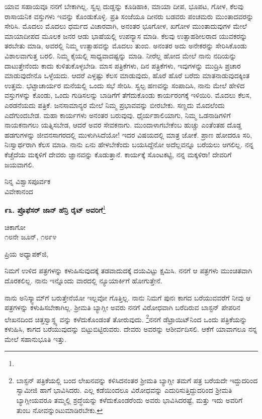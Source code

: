 ಯಾವ ಸಹಾಯವೂ ನನಗೆ ಬೇಕಾಗಿಲ್ಲ. ಸ್ವಲ್ಪ ದುಡ್ಡನ್ನು ಕೂಡಿಹಾಕಿ, ಮಾಯಾ ದೀಪ, ಭೂಪಟ, ಗೋಳ, ಕೆಲವು ರಾಸಾಯನಿಕ ವಸ್ತುಗಳು ಇವನ್ನು ಕೊಂಡುಕೊಳ್ಳಿ. ಪ್ರತಿ ಸಂಜೆಯೂ ದೀನರು ಬಡವರು ಪಂಚಮರು ಮುಂತಾದವರನ್ನು ಸೇರಿಸಿ. ಮೊದಲು ಮೊದಲು ಧರ್ಮದ ವಿಚಾರವಾಗಿ, ಅನಂತರ ಭೂಗೋಳ, ಖಗೋಳ ಮುಂತಾದುವುಗಳ ಮೇಲೆ ಮಾಯಾದೀಪದ ಮೂಲಕ ಜನರ ಆಡು ಭಾಷೆಯಲ್ಲಿ ಉಪನ್ಯಾಸ ಮಾಡಿ. ಕೆಲವು ಉತ್ಸಾಹಶೀಲರಾದ ಯುವಕರನ್ನು ತರಬೇತು ಮಾಡಿ, ಅವರಲ್ಲಿ ನಿಮ್ಮ ಉತ್ಸಾಹವನ್ನು ಮೊದಲು ತುಂಬಿ. ಅನಂತರ ಅದು ಅನೇಕರನ್ನು ಸೇರಿಸಿಕೊಂಡು ವಿಶಾಲವಾಗುತ್ತ ಬರಲಿ. ನಿಮ್ಮ ಕೈಯಲ್ಲಿ ಸಾಧ್ಯವಾದಷ್ಟನ್ನು ಮಾಡಿ. ನೀರೆಲ್ಲ ಹೋದ ಮೇಲೆ ನಾನು ನದಿಯನ್ನು ದಾಟುತ್ತೇನೆಂದು ಕಾದು ಕುಳಿತುಕೊಳ್ಳಬೇಡಿ. ಮಾಸ ಪತ್ರಿಕೆಗಳು, ದಿನ ಪತ್ರಿಕೆಗಳು, ಇವುಗಳನ್ನು ಮುದ್ರಿಸಿ ಪ್ರಚಾರ ಮಾಡುವುದೇನೊ ಒಳ್ಳೆಯದು. ಆದರೆ ಎಳ್ಳಷ್ಟು ಕೆಲಸ ಮಾಡುವುದು, ಹೊರೆ ಹೊರೆ ಬರೆದು ಮಾತನಾಡುವುದಕ್ಕಿಂತ ಉತ್ತಮ. ಭಟ್ಟಾಚಾರ್ಯರ ಮನೆಯಲ್ಲಿ ಒಂದು ಸಭೆ ಸೇರಿಸಿ. ಸ್ವಲ್ಪ ಹಣವನ್ನು ಸಂಪಾದಿಸಿ, ನಾನು ಮೇಲೆ ಹೇಳಿದ ವಸ್ತುಗಳನ್ನು ಕೊಂಡು, ಒಂದು ಗುಡಿಸಲನ್ನು ಬಾಡಿಗೆಗೆ ತೆಗೆದುಕೊಂಡು ಕಾರ್ಯರಂಗಕ್ಕೆ ಇಳಿಯಿರಿ. ಮೊದಲು ಕೆಲಸ, ಎರಡನೆಯದು ಪತ್ರಿಕೆ. ಜನಸಾಮಾನ್ಯರ ಮೇಲೆ ನಿಮ್ಮ ಪ್ರಭಾವವನ್ನು ಬೀರಬೇಕು. ಸಣ್ಣದು ಮೊದಲೆಂದು ಎದೆಗುಂದಬೇಡ. ಮಹಾ ಕಾರ್ಯಗಳು ಅನಂತರ ಬರುವುವು. ಧೈರ್ಯಶಾಲಿಯಾಗು, ನಿಮ್ಮ ಒಡನಾಡಿಗಳಿಗೆ ನಾಯಕನಾಗಲು ಯತ್ನಿಸಬೇಡ, ಆದರೆ ಅವರ ಸೇವಕನಾಗು. ಮುಂದಾಳಾಗಬೇಕೆಂಬ ಹುಚ್ಚು ಎಂತೆಂತಹ ದೊಡ್ಡ ಹಡಗುಗಳನ್ನು ಜೀವನಸಾಗರದಲ್ಲಿ ಮುಳುಗಿಸಿದೆಯೋ! ಇದರ ವಿಷಯದಲ್ಲಿ ಮಾತ್ರ ಜೋಕೆ. ಪ್ರಾಣ ಹೋದರೂ ಸರಿ, ನಿಃಸ್ವಾರ್ಥರಾಗಿ ಕೆಲಸ ಮಾಡಿ. ನಾನು ಏನು ಹೇಳಬೇಕೆಂದು ಬಯಸಿದ್ದೆನೋ ಅದೆಲ್ಲವನ್ನೂ ಬರೆಯಲು ಆಗಲಿಲ್ಲ. ನನ್ನ ಕೆಚ್ಚೆದೆಯ ಮಕ್ಕಳಿಗೆ ದೇವರು ಜ್ಞಾನವನ್ನು ಕೊಡುತ್ತಾನೆ. ಕಾರ್ಯಕ್ಕೆ ಸೊಂಟಕಟ್ಟಿ, ನನ್ನ ಮಕ್ಕಳಿರಾ! ದೇವರಿಗೆ ಜಯವಾಗಲಿ.
\vspace{-0.4cm}

{\flushright
ನಿನ್ನ ವಿಶ್ವಾಸಪೂರ್ವಕ\\ವಿವೇಕಾನಂದ\par}
\vspace{-0.4cm}

\begin{center}
\textbf{೯೩. ಪ್ರೊಫೆಸರ್ ಜಾನ್ ಹೆನ್ರಿ ರೈಟ್ ಅವರಿಗೆ}\footnote{}
\end{center}
\vspace{-0.4cm}
	
\begin{flushright}
ಚಿಕಾಗೋ\\೧೮ನೇ ಜೂನ್, ೧೮೯೪
\end{flushright}

\noindent
ಪ್ರಿಯ ಅಧ್ಯಾಪಕ್‌ಜಿ,

ನಿಮಗೆ ಉಳಿದ ಪತ್ರಗಳನ್ನು ಕಳುಹಿಸುವುದಕ್ಕೆ ತಡವಾದುದಕ್ಕೆ ದಯವಿಟ್ಟು ಕ್ಷಮಿಸಿ. ನನಗೆ ಆ ಪತ್ರಗಳು ಮುಂಚಿತವಾಗಿ ದೊರಕಲಿಲ್ಲ. ನಾನು ಇನ್ನೊಂದು ವಾರದಲ್ಲಿ ನ್ಯೂಯಾರ್ಕಿಗೆ ಹೋಗುತ್ತೇನೆ.

ನಾನು ಅನಿಸ್ಕ್ವಾಮ್‌ಗೆ ಬರುತ್ತೇನೆಯೋ ಇಲ್ಲವೋ ಗೊತ್ತಿಲ್ಲ. ನಾನು ನಿಮಗೆ ಪುನಃ ಕಾಗದ ಬರೆಯುವವರೆಗೆ ನೀವು ಆ ಪತ್ರಗಳನ್ನು ಕಳುಹಿಸಬೇಕಾಗಿಲ್ಲ. ಶ‍್ರೀಮತಿ ಬ್ಯಾಗ್ಲೀ ಅವರು ನನಗೆ ವಿರೋಧವಾಗಿ ಬರೆದಿರುವ ಬಾಸ್ಟನ್ ಪೇಪರಿನ ಲೇಖನದಿಂದ ಚಿತ್ತಸ್ವಾಸ್ಥ್ಯ ವನ್ನು ಕಳೆದುಕೊಂಡಂತೆ ತೋರುವುದು. \footnote{ಬಾಸ್ಟನ್ ಪತ್ರಿಕೆಯಲ್ಲಿ ಬಂದ ಲೇಖನವನ್ನು ಕಳಿಸಿದನಂತರ ಶ‍್ರೀಮತಿ ಬ್ಯಾಗ್ಲೀ ತಮಗೆ ಪತ್ರ ಬರೆಯದೇ ಇದ್ದುದರಿಂದ ಸ್ವಾಮೀಜಿ ಹಾಗೆ ಭಾವಿಸಿದರು. ಎಲ್ಲ ಕಡೆಯಿಂದಲೂ ವಿರೋಧವನ್ನು ಎದುರಿಸುತ್ತಿದ್ದುದರಿಂದ ಶ‍್ರೀಮತಿ ಬ್ಯಾಗ್ಲೀಯವರೂ ತಮ್ಮಲ್ಲಿ ಶ್ರದ್ಧೆಯನ್ನು ಕಳೆದುಕೊಂಡರೆಂದು ಅವರು ಭಾವಿಸಿದರಷ್ಟೆ, ಮತ್ತು ಇದು ಅವರಿಗೆ ತುಂಬ ನೋವನ್ನುಂಟುಮಾಡಿರಬೇಕು.}ನನಗೆ ಡೆಟ್ರಾಯಿಟ್‌ನಿಂದ ಒಂದು ಪತ್ರಿಕೆಯನ್ನು ಕಳುಹಿಸಿ, ಕಾಗದ ಬರೆಯುವುದನ್ನು ಬಿಟ್ಟುಬಿಟ್ಟಿರುವರು. ದೇವರು ಅವರನ್ನು ಆಶೀರ್ವದಿಸಲಿ. ಆಕೆಗೆ ಯಾವಾಗಲೂ ನನ್ನ ಮೇಲೆ ಸಹಾನುಭೂತಿ ಇತ್ತು.

